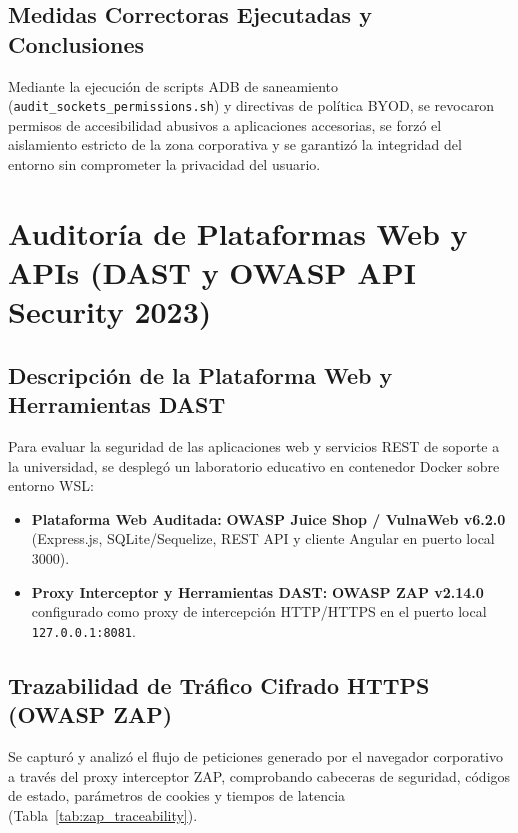 \documentclass[11pt,a4paper]{article}
\begin{document}
\subsection{Medidas Correctoras Ejecutadas y Conclusiones}
Mediante la ejecución de scripts ADB de saneamiento (\texttt{audit\_sockets\_permissions.sh}) y directivas de política BYOD, se revocaron permisos de accesibilidad abusivos a aplicaciones accesorias, se forzó el aislamiento estricto de la zona corporativa y se garantizó la integridad del entorno sin comprometer la privacidad del usuario.

\section{Auditoría de Plataformas Web y APIs (DAST y OWASP API Security 2023)}

\subsection{Descripción de la Plataforma Web y Herramientas DAST}
Para evaluar la seguridad de las aplicaciones web y servicios REST de soporte a la universidad, se desplegó un laboratorio educativo en contenedor Docker sobre entorno WSL:
\begin{itemize}[noitemsep]
    \item \textbf{Plataforma Web Auditada:} \textbf{OWASP Juice Shop / VulnaWeb v6.2.0} (Express.js, SQLite/Sequelize, REST API y cliente Angular en puerto local 3000).
    \item \textbf{Proxy Interceptor y Herramientas DAST:} \textbf{OWASP ZAP v2.14.0} configurado como proxy de intercepción HTTP/HTTPS en el puerto local \texttt{127.0.0.1:8081}.
\end{itemize}

\subsection{Trazabilidad de Tráfico Cifrado HTTPS (OWASP ZAP)}
Se capturó y analizó el flujo de peticiones generado por el navegador corporativo a través del proxy interceptor ZAP, comprobando cabeceras de seguridad, códigos de estado, parámetros de cookies y tiempos de latencia (Tabla~\ref{tab:zap_traceability}).
\end{document}
